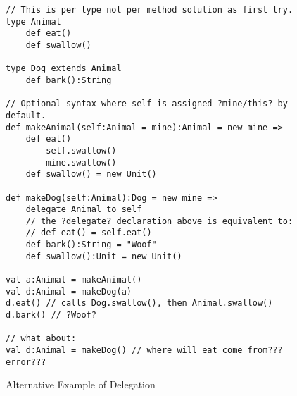 \documentclass[preprint]{sigplanconf}
\begin{document}
\begin{figure*}
\begin{lstlisting}
// This is per type not per method solution as first try.
type Animal
	def eat()
	def swallow()

type Dog extends Animal
	def bark():String

// Optional syntax where self is assigned ?mine/this? by default.
def makeAnimal(self:Animal = mine):Animal = new mine =>
	def eat()
		self.swallow()
		mine.swallow()
	def swallow() = new Unit()

def makeDog(self:Animal):Dog = new mine =>
	delegate Animal to self
	// the ?delegate? declaration above is equivalent to:
	// def eat() = self.eat()
	def bark():String = "Woof"
	def swallow():Unit = new Unit()

val a:Animal = makeAnimal()
val d:Animal = makeDog(a)
d.eat() // calls Dog.swallow(), then Animal.swallow()
d.bark() // ?Woof?

// what about:
val d:Animal = makeDog() // where will eat come from??? error???
\end{lstlisting}
\label{f:dylan-style}
\caption{Alternative Example of Delegation}
\end{figure*}



\end{document}
